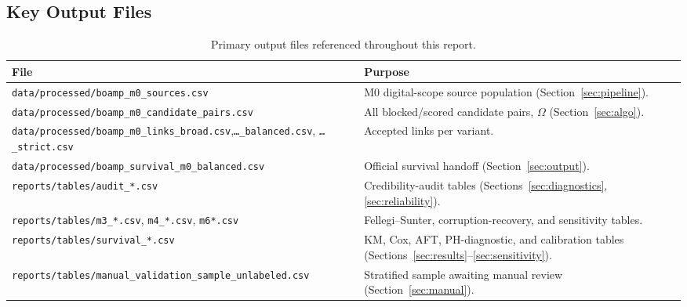 \documentclass[11pt]{article}
\begin{document}
\subsection{Key Output Files}
\begin{table}[h!]
\centering
\caption{Primary output files referenced throughout this report.}
\small
\begin{tabular}{p{}p{}}
\toprule
File & Purpose \\
\midrule
\texttt{data/processed/boamp\_m0\_sources.csv} & M0 digital-scope source population (Section~\ref{sec:pipeline}). \\
\texttt{data/processed/boamp\_m0\_candidate\_pairs.csv} & All blocked/scored candidate pairs, $\Omega$ (Section~\ref{sec:algo}). \\
\texttt{data/processed/boamp\_m0\_links\_broad.csv},\newline\texttt{\ldots\_balanced.csv}, \texttt{\ldots\_strict.csv} & Accepted links per variant. \\
\texttt{data/processed/boamp\_survival\_m0\_balanced.csv} & Official survival handoff (Section~\ref{sec:output}). \\
\texttt{reports/tables/audit\_*.csv} & Credibility-audit tables (Sections~\ref{sec:diagnostics}, \ref{sec:reliability}). \\
\texttt{reports/tables/m3\_*.csv}, \texttt{m4\_*.csv}, \texttt{m6*.csv} & Fellegi--Sunter, corruption-recovery, and sensitivity tables. \\
\texttt{reports/tables/survival\_*.csv} & KM, Cox, AFT, PH-diagnostic, and calibration tables (Sections~\ref{sec:results}--\ref{sec:sensitivity}). \\
\texttt{reports/tables/}\newline\texttt{manual\_validation\_sample\_unlabeled.csv} & Stratified sample awaiting manual review (Section~\ref{sec:manual}). \\
\bottomrule
\end{tabular}
\end{table}
\end{document}

